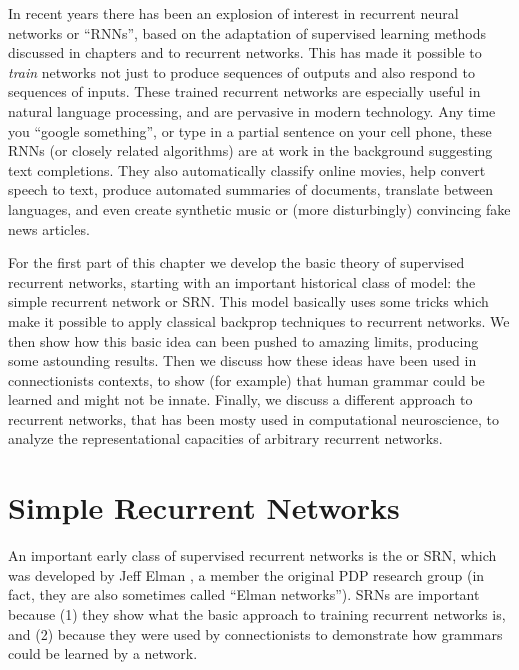 In recent years there has been an explosion of interest in recurrent neural networks or ``RNNs'', based on the adaptation of supervised learning methods discussed in chapters  and  to recurrent networks. This has made it possible to \emph{train} networks not just to produce sequences of outputs and also respond to sequences of inputs. These  trained recurrent networks are especially useful in natural language processing, and are pervasive in modern technology. Any time you ``google something'', or type in a partial sentence on your cell phone, these RNNs (or closely related algorithms) are at work in the background suggesting text completions. They also automatically classify online movies, help convert speech to text, produce automated summaries of documents, translate between languages, and even create synthetic music or (more disturbingly) convincing fake news articles. 

For the first part of this chapter we develop the basic theory of supervised recurrent networks, starting with an important historical class of model: the simple recurrent network or SRN. This model basically uses some tricks which make it possible to apply classical backprop techniques to recurrent networks. We then show how this basic idea can been pushed to amazing limits, producing some astounding results. Then we discuss how these ideas have been used in connectionists contexts, to show (for example) that human grammar could be learned and might not be innate. Finally, we discuss a different approach to recurrent networks, that has been mosty used in computational neuroscience, to analyze the representational capacities of  arbitrary recurrent networks.
	
\section{Simple Recurrent Networks}

An important early class of supervised recurrent networks is the  or SRN, which  was developed by Jeff Elman \cite{elman1990finding}, a member the original PDP research group  (in fact, they are also sometimes called ``Elman networks''). SRNs are important because (1) they show what the basic approach to training recurrent networks is, and (2) because they were used by connectionists to demonstrate how grammars could be learned by a network. 


